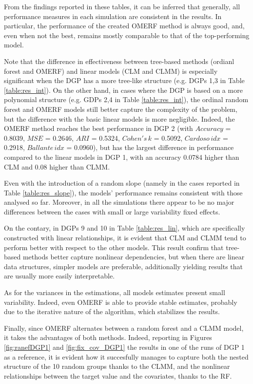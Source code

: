 From the findings reported in these tables, it can be inferred that generally, all performance measures in each simulation are consistent in the results. In particular, the performance of the created OMERF method is always good, and, even when not the best, remains mostly comparable to that of the top-performing model.

Note that the difference in effectiveness between tree-based methods (ordianl forest and OMERF) and linear models (CLM and CLMM) is especially significant when the DGP has a more tree-like structure (e.g. DGPs 1,3 in Table \ref{table:res_int}).
On the other hand, in cases where the DGP is based on a more polynomial structure (e.g. GDPs 2,4 in Table \ref{table:res_int}), the ordinal random forest and OMERF models still better capture the complexity of the problem, but the difference with the basic linear models is more negligible.
Indeed, the OMERF method reaches the best performance in DGP 2 (with \(Accuracy\) = 0.8039, \(MSE\) = 0.2646, \(ARI\) = 0.5324, \(Cohen's \, k\) = 0.5092, \(Cardoso \, idx\) = 0.2918, \(Ballante \, idx\) = 0.0960),
but has the largest difference in performance compared to the linear models in DGP 1, with an accuracy 0.0784 higher than CLM and 0.08 higher than CLMM.

Even with the introduction of a random slope (namely in the cases reported in Table \ref{table:res_slope}), the models' performance remains consistent with those analysed so far.
Moreover, in all the simulations there appear to be no major differences between the cases with small or large variability fixed effects.

On the contary, in DGPs 9 and 10 in Table \ref{table:res_lin}, which are specifically constructed with linear relationships, it is evident that CLM and CLMM tend to perform better with respect to the other models.
This result confirm that tree-based methods better capture nonlinear dependencies, but when there are linear data structures, simpler models are preferable, additionally yielding results that are usually more easily interpretable.

As for the variances in the estimations, all models estimates present small variability. Indeed, even OMERF is able to provide stable estimates, probably due to the iterative nature of the algorithm, which stabilizes the results.

Finally, since OMERF alternates between a random forest and a CLMM model, it takes the advantages of both methods.
Indeed, reporting in Figures \ref{fig:ranefDGP1} and \ref{fig:fix_cov_DGP1} the results in one of the runs of DGP 1 as a reference, it is evident how it succesfully manages to capture both the nested structure of the 10 random groups thanks to the CLMM, and the nonlinear relationships between the target value and the covariates, thanks to the RF.

